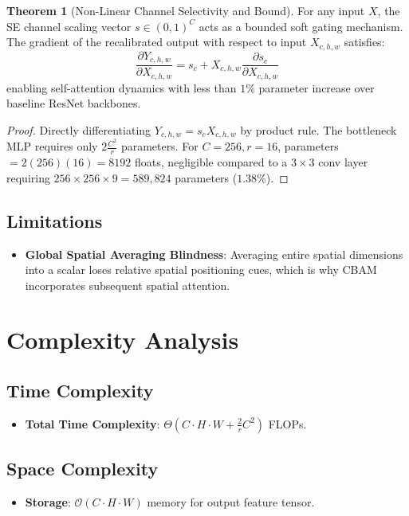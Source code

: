 \documentclass[11pt,a4paper]{article}
\theoremstyle{definition}
\newtheorem{theorem}{Theorem}[section]
\begin{document}
\begin{theorem}[Non-Linear Channel Selectivity and Bound]
For any input $X$, the SE channel scaling vector $s \in (0, 1)^C$ acts as a bounded soft gating mechanism. The gradient of the recalibrated output with respect to input $X_{c, h, w}$ satisfies:
\begin{equation}
\frac{\partial Y_{c, h, w}}{\partial X_{c, h, w}} = s_c + X_{c, h, w} \frac{\partial s_c}{\partial X_{c, h, w}}
\end{equation}
enabling self-attention dynamics with less than $1\%$ parameter increase over baseline ResNet backbones.
\end{theorem}

\begin{proof}
Directly differentiating $Y_{c, h, w} = s_c X_{c, h, w}$ by product rule.
The bottleneck MLP requires only $2 \frac{C^2}{r}$ parameters. For $C = 256, r = 16$, parameters $= 2(256)(16) = 8192$ floats, negligible compared to a $3 \times 3$ conv layer requiring $256 \times 256 \times 9 = 589,824$ parameters ($1.38\%$).
\end{proof}

\subsection{Limitations}
\begin{itemize}
    \item \textbf{Global Spatial Averaging Blindness}: Averaging entire spatial dimensions into a scalar loses relative spatial positioning cues, which is why CBAM incorporates subsequent spatial attention.
\end{itemize}

\section{Complexity Analysis}

\subsection{Time Complexity}
\begin{itemize}
    \item \textbf{Total Time Complexity}: $\Theta(C \cdot H \cdot W + \frac{2}{r} C^2)$ FLOPs.
\end{itemize}

\subsection{Space Complexity}
\begin{itemize}
    \item \textbf{Storage}: $\mathcal{O}(C \cdot H \cdot W)$ memory for output feature tensor.
\end{itemize}
\end{document}
